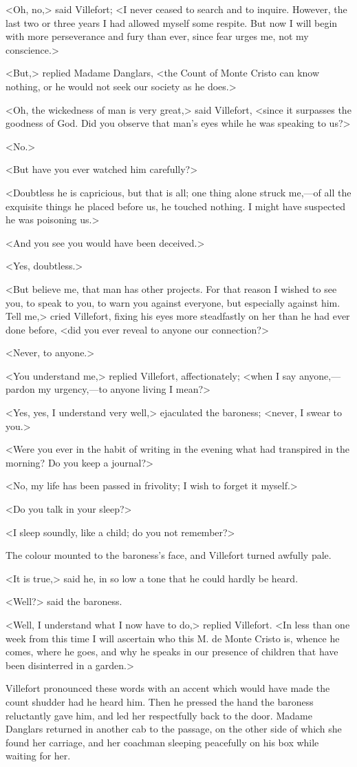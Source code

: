  <Oh, no,> said Villefort; <I never ceased to search and to inquire. However, the last two or three years I had allowed myself some respite. But now I will begin with more perseverance and fury than ever, since fear urges me, not my conscience.> 

 <But,> replied Madame Danglars, <the Count of Monte Cristo can know nothing, or he would not seek our society as he does.> 

 <Oh, the wickedness of man is very great,> said Villefort, <since it surpasses the goodness of God. Did you observe that man's eyes while he was speaking to us?> 

 <No.> 

 <But have you ever watched him carefully?> 

 <Doubtless he is capricious, but that is all; one thing alone struck me,—of all the exquisite things he placed before us, he touched nothing. I might have suspected he was poisoning us.> 

 <And you see you would have been deceived.> 

 <Yes, doubtless.> 

 <But believe me, that man has other projects. For that reason I wished to see you, to speak to you, to warn you against everyone, but especially against him. Tell me,> cried Villefort, fixing his eyes more steadfastly on her than he had ever done before, <did you ever reveal to anyone our connection?> 

 <Never, to anyone.> 

 <You understand me,> replied Villefort, affectionately; <when I say anyone,—pardon my urgency,—to anyone living I mean?> 

 <Yes, yes, I understand very well,> ejaculated the baroness; <never, I swear to you.> 

 <Were you ever in the habit of writing in the evening what had transpired in the morning? Do you keep a journal?> 

 <No, my life has been passed in frivolity; I wish to forget it myself.> 

 <Do you talk in your sleep?>

<I sleep soundly, like a child; do you not remember?> 

 The colour mounted to the baroness's face, and Villefort turned awfully pale. 

 <It is true,> said he, in so low a tone that he could hardly be heard. 

 <Well?> said the baroness. 

 <Well, I understand what I now have to do,> replied Villefort. <In less than one week from this time I will ascertain who this M. de Monte Cristo is, whence he comes, where he goes, and why he speaks in our presence of children that have been disinterred in a garden.> 

 Villefort pronounced these words with an accent which would have made the count shudder had he heard him. Then he pressed the hand the baroness reluctantly gave him, and led her respectfully back to the door. Madame Danglars returned in another cab to the passage, on the other side of which she found her carriage, and her coachman sleeping peacefully on his box while waiting for her. 